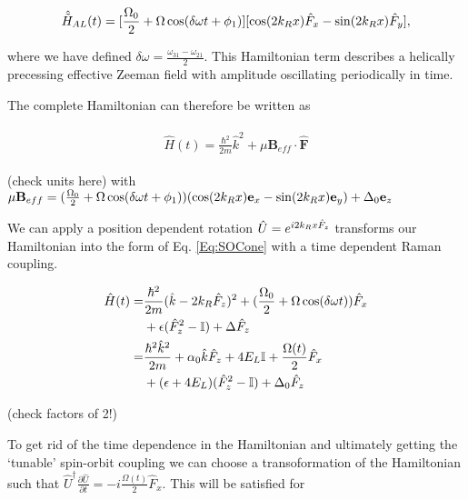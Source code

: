 \begin{align}
 	\begin{split}
 		\hat{\tilde{H}}_{AL}(t)  = [\frac{\Omega_0}{2} + \Omega\cos(\delta\omega t+\phi_1)][\cos(2{{k_R}} x)\hat{F}_x - \sin(2{{k_R}} x)\hat{F}_y],
 	\end{split}
\end{align}


where we have defined $\delta\omega=\frac{\omega_{31}-\omega_{21}}{2}$. This Hamiltonian term describes a helically precessing effective Zeeman field with amplitude oscillating periodically in time. 

The complete Hamiltonian can therefore be written as

\begin{align}
	\begin{split}
		\hat{H}(t)=\frac{\hbar^2}{2m}\hat{k}^2 + \mu\mathbf{B}_{eff}\cdot\hat{\mathbf{F}}
		\label{Eq:Beff}
	\end{split}
\end{align}

(check units here)
with $\mu\mathbf{B}_{eff}=(\frac{\Omega_0}{2} + \Omega\cos(\delta\omega t+\phi_1))(\cos(2{{k_R}} x)\mathbf{e}_x-\sin(2{{k_R}} x)\mathbf{e}_y)+\Delta_0\mathbf{e}_z$


We can apply a position dependent rotation $\hat{U} = e^{i2{{k_R}} x \hat{F}_z}$ transforms our Hamiltonian into the form of Eq. \ref{Eq:SOCone} with a time dependent Raman coupling.

\begin{align}
	\begin{split}
		\hat{H}(t) = & \frac{\hbar^2}{2m}(\hat{k}-2{{k_R}}\hat{F}_z)^2 + (\frac{\Omega_0}{2} + \Omega\cos(\delta\omega t))\hat{F}_x \\& + \epsilon(\hat{F}_z^2-\mathbb{I})+\Delta\hat{F}_z \\
		=&\frac{\hbar^2\hat{k}^2}{2m} + \alpha_0\hat{k}\hat{F}_z +4E_L\mathbb{I} + \frac{\Omega(t)}{2}\hat{F}_x\\
		& +(\epsilon+4E_L)(\hat{F}_z^2-\mathbb{I}) +\Delta_0\hat{F}_z 
	\end{split}
\end{align}

(check factors of 2!)

To get rid of the time dependence in the Hamiltonian and ultimately getting the `tunable' spin-orbit coupling we can choose a transoformation of the Hamiltonian such that $\hat{U}^{\dagger} \frac{\partial\hat{U}}{\partial t} = -i \frac{\Omega(t)}{2}\hat{F}_x$. This will be satisfied for

